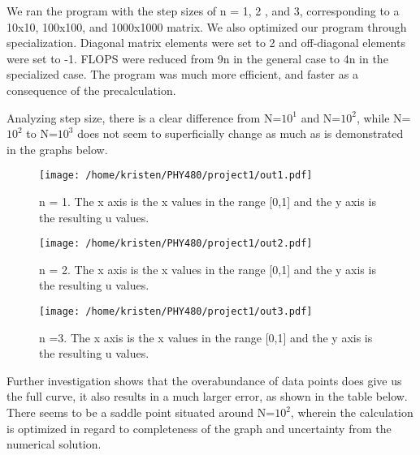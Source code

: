 \documentclass[10pt,showpacs,preprintnumbers,footinbib,amsmath,amssymb,aps,prl,twocolumn,groupedaddress,superscriptaddress,showkeys]{revtex4-1}
\begin{document}
 We ran the program with the step sizes of n = 1, 2 , and 3, corresponding to a 10x10, 100x100, and 1000x1000 matrix. We also optimized our program through specialization. Diagonal matrix elements were set to 2 and off-diagonal elements were set to -1. FLOPS were reduced from 9n in the general case to 4n in the specialized case. The program was much more efficient, and faster as a consequence of the precalculation. 

 Analyzing step size, there is a clear difference from N=$10^{1}$ and N=$10^{2}$, while N=$10^{2}$ to N=$10^{3}$ does not seem to superficially change as much as is demonstrated in the graphs below.
 
\begin{figure}[!ht]
	\centering
	\texttt{[image: /home/kristen/PHY480/project1/out1.pdf]}
	\label{uvx}
	\caption{ n = 1. The x axis is the x values in the range [0,1] and the y axis is the resulting u values.}
\end{figure}

\begin{figure}[!ht]
	\centering
	\texttt{[image: /home/kristen/PHY480/project1/out2.pdf]}

	\label{uvx}
	\caption{n = 2. The x axis is the x values in the range [0,1] and the y axis is the resulting u values.}
\end{figure}

\begin{figure}[!ht]
	\centering
	\texttt{[image: /home/kristen/PHY480/project1/out3.pdf]}

	\label{uvx}
	\caption{n =3.  The x axis is the x values in the range [0,1] and the y axis is the resulting u values.}
\end{figure}

Further investigation shows that the overabundance of data points does give us the full curve, it also results in a much larger error, as shown in the table below. There seems to be a saddle point situated around N=$10^{2}$, wherein the calculation is optimized in regard to completeness of the graph and uncertainty from the numerical solution.
\end{document}
